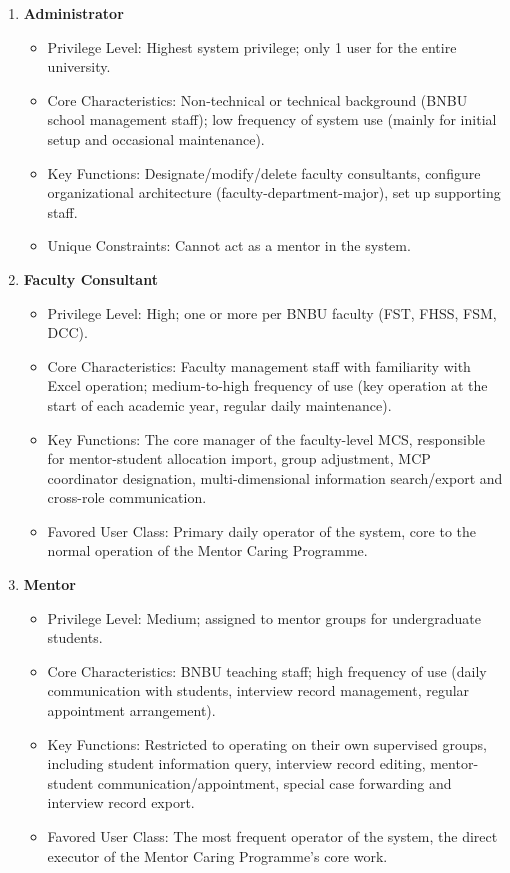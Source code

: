 \documentclass[a4paper,12pt]{article}
\begin{document}
\begin{enumerate}
\item \textbf{Administrator}
\begin{itemize}
\item Privilege Level: Highest system privilege; only 1 user for the entire university.
\item Core Characteristics: Non-technical or technical background (BNBU school management staff); low frequency of system use (mainly for initial setup and occasional maintenance).
\item Key Functions: Designate/modify/delete faculty consultants, configure organizational architecture (faculty-department-major), set up supporting staff.
\item Unique Constraints: Cannot act as a mentor in the system.
\end{itemize}

\item \textbf{Faculty Consultant}
\begin{itemize}
\item Privilege Level: High; one or more per BNBU faculty (FST, FHSS, FSM, DCC).
\item Core Characteristics: Faculty management staff with familiarity with Excel operation; medium-to-high frequency of use (key operation at the start of each academic year, regular daily maintenance).
\item Key Functions: The core manager of the faculty-level MCS, responsible for mentor-student allocation import, group adjustment, MCP coordinator designation, multi-dimensional information search/export and cross-role communication.
\item Favored User Class: Primary daily operator of the system, core to the normal operation of the Mentor Caring Programme.
\end{itemize}

\item \textbf{Mentor}
\begin{itemize}
\item Privilege Level: Medium; assigned to mentor groups for undergraduate students.
\item Core Characteristics: BNBU teaching staff; high frequency of use (daily communication with students, interview record management, regular appointment arrangement).
\item Key Functions: Restricted to operating on their own supervised groups, including student information query, interview record editing, mentor-student communication/appointment, special case forwarding and interview record export.
\item Favored User Class: The most frequent operator of the system, the direct executor of the Mentor Caring Programme's core work.
\end{itemize}


\end{enumerate}
\end{document}
